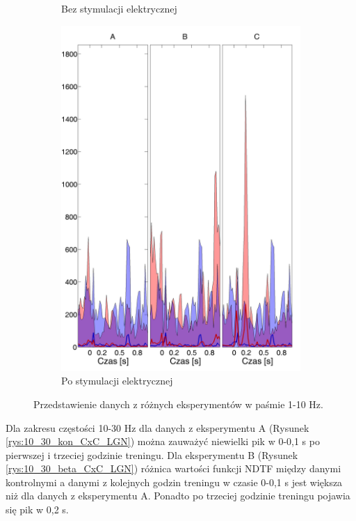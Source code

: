\documentclass{pracamgr_2}
\begin{document}
\begin{figure}[h]
\begin{subfigure}{.5\textwidth}
			\caption{Bez stymulacji elektrycznej}
			\label{rys:1_10_kon_CxC_LGN}
		\end{subfigure}%
		\begin{subfigure}{.5\textwidth}
			\centering
			\includegraphics[width=1.\linewidth]{beta3_1-10_z_CxC5_do_LGN42.png}
			\caption{Po stymulacji elektrycznej}
			\label{rys:1_10_beta_CxC_LGN}
		\end{subfigure}
		\caption{Przedstawienie danych z różnych eksperymentów w paśmie 1-10 Hz.}
		\label{rys:1_10_CxC_LGN}
	\end{figure}
	\FloatBarrier
	Dla zakresu częstości 10-30 Hz dla danych z eksperymentu A (Rysunek \ref{rys:10_30_kon_CxC_LGN}) można zauważyć niewielki pik w 0-0,1 s po pierwszej i trzeciej godzinie treningu. Dla eksperymentu B (Rysunek \ref{rys:10_30_beta_CxC_LGN}) różnica wartości funkcji NDTF między danymi kontrolnymi a danymi z kolejnych godzin treningu w czasie 0-0,1 s jest większa niż dla danych z eksperymentu A. Ponadto po trzeciej godzinie treningu pojawia się pik w 0,2 s.
\end{document}
